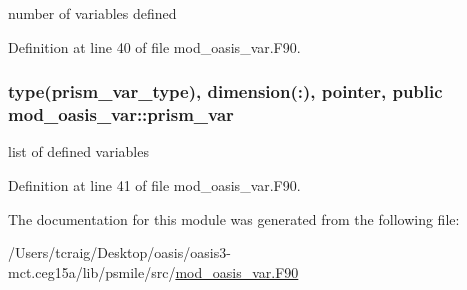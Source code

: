 number of variables defined 



Definition at line 40 of file mod\+\_\+oasis\+\_\+var.\+F90.

\hypertarget{classmod__oasis__var_ae66c490437c2960d795fbd3d2c773a0a}{
\subsubsection[{prism\+\_\+var}]{\setlength{\rightskip}{0pt plus 5cm}type({\bf prism\+\_\+var\+\_\+type}), dimension(\+:), pointer, public mod\+\_\+oasis\+\_\+var\+::prism\+\_\+var}}\label{classmod__oasis__var_ae66c490437c2960d795fbd3d2c773a0a}


list of defined variables 



Definition at line 41 of file mod\+\_\+oasis\+\_\+var.\+F90.



The documentation for this module was generated from the following file\+:\begin{DoxyCompactItemize}
\item 
/\+Users/tcraig/\+Desktop/oasis/oasis3-\/mct.\+ceg15a/lib/psmile/src/\hyperlink{mod__oasis__var_8_f90}{mod\+\_\+oasis\+\_\+var.\+F90}\end{DoxyCompactItemize}

